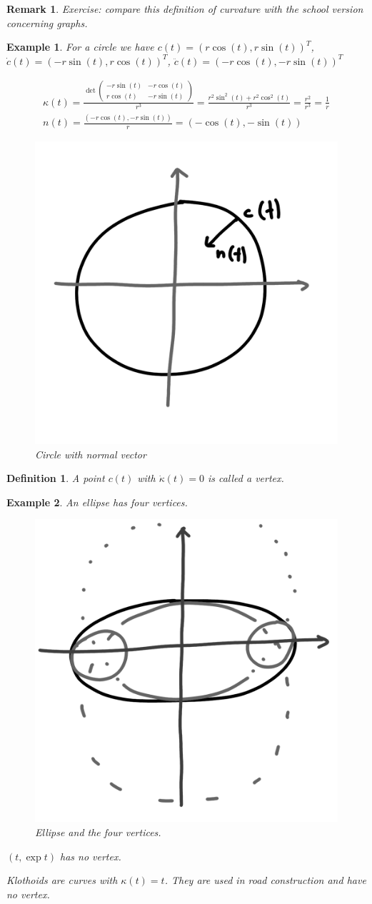 \documentclass[]{article}
\newtheorem{definition}{Definition}
\newtheorem{example}{Example}
\newtheorem{remark}{Remark}
\begin{document}
\begin{remark}
	Exercise: compare this definition of curvature with the school version concerning graphs.
\end{remark}

\begin{example}
	For a circle we have $c(t) = (r\cos(t), r\sin(t))^T$, $\dot{c}(t) = (-r\sin(t), r\cos(t))^T$, $\ddot{c}(t) = (-r\cos(t), -r\sin(t))^T$
	
	\begin{align*}
		\kappa(t) = \frac{\det \left(\begin{matrix}
				-r \sin(t) & -r \cos(t) \\
				r \cos(t) & -r \sin(t)
		\end{matrix}\right) }{r^3} = \frac{r^2\sin^2(t) + r^2\cos^2(t)}{r^3} = \frac{r^2}{r^3} = \frac{1}{r}\\
		n(t) = \frac{(-r \cos(t), -r \sin(t))}{r} = (-\cos(t), -\sin(t))
	\end{align*}
	
	\begin{figure}[h!]
		\centering
		\includegraphics[width=0.3\linewidth]{figures/circle_with_normal_vector}
		\caption{Circle with normal vector}
		\label{fig:circlewithnormalvector}
	\end{figure}
	
\end{example}

\begin{definition}
	A point $c(t)$ with $\dot{\kappa}(t) = 0$ is called a vertex.
\end{definition}

\begin{example}
	An ellipse has four vertices.
	
	\begin{figure}[h!]
		\centering
		\includegraphics[width=0.3\linewidth]{figures/ellipse}
		\caption{Ellipse and the four vertices.}
		\label{fig:ellipse}
	\end{figure}
	
	
	$(t, \exp t)$ has no vertex.
	
	Klothoids are curves with $\kappa(t) = t$. They are used in road construction and have no vertex.
\end{example}
\end{document}
